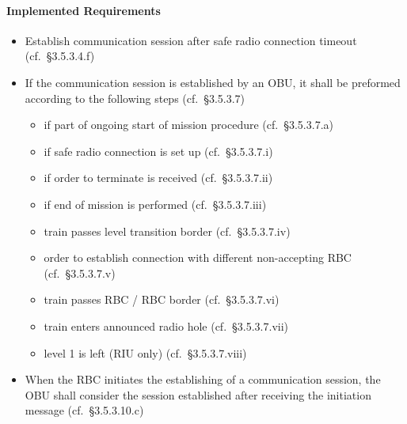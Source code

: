 \documentclass{template/openetcs_article}
\begin{document}
\paragraph{Implemented Requirements}
\label{sec:impl-requ-4}

\begin{itemize}
\item Establish communication session after safe radio connection timeout
  (cf.~§3.5.3.4.f)
\item If the communication session is established by an OBU, it shall be
  preformed according to the following steps (cf.~§3.5.3.7)
  \begin{itemize}
  \item if part of ongoing start of mission procedure (cf.~§3.5.3.7.a)
  \item if safe radio connection is set up (cf.~§3.5.3.7.i)
  \item if order to terminate is received (cf.~§3.5.3.7.ii)
  \item if end of mission is performed (cf.~§3.5.3.7.iii)
  \item train passes level transition border (cf.~§3.5.3.7.iv)
  \item order to establish connection with different non-accepting RBC
    (cf.~§3.5.3.7.v)
  \item train passes RBC / RBC border (cf.~§3.5.3.7.vi)
  \item train enters announced radio hole (cf.~§3.5.3.7.vii)
  \item level 1 is left (RIU only) (cf.~§3.5.3.7.viii)
  \end{itemize}
\item When the RBC initiates the establishing of a communication session, the
  OBU shall consider the session established after receiving the initiation
  message (cf.~§3.5.3.10.c)
\end{itemize}

%



\end{document}
